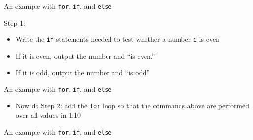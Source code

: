 \documentclass[ignorenonframetext,]{beamer}
\newenvironment{Shaded}{\begin{snugshade}}{\end{snugshade}}
\newcommand{\KeywordTok}[1]{\textcolor[rgb]{0.13,0.29,0.53}{\textbf{#1}}}
\newcommand{\DecValTok}[1]{\textcolor[rgb]{0.00,0.00,0.81}{#1}}
\newcommand{\StringTok}[1]{\textcolor[rgb]{0.31,0.60,0.02}{#1}}
\newcommand{\ControlFlowTok}[1]{\textcolor[rgb]{0.13,0.29,0.53}{\textbf{#1}}}
\newcommand{\OperatorTok}[1]{\textcolor[rgb]{0.81,0.36,0.00}{\textbf{#1}}}
\newcommand{\NormalTok}[1]{#1}
\providecommand{\tightlist}{%
	\setlength{\itemsep}{0pt}\setlength{\parskip}{0pt}}
\begin{document}
\begin{frame}[fragile]{An example with \texttt{for}, \texttt{if}, and
\texttt{else}}

Step 1:

\begin{itemize}
\tightlist
\item
  Write the \texttt{if} statements needed to test whether a number
  \texttt{i} is even
\item
  If it is even, output the number and ``is even.''
\item
  If it is odd, output the number and ``is odd''
\end{itemize}

\end{frame}

\begin{frame}[fragile]{An example with \texttt{for}, \texttt{if}, and
\texttt{else}}

\begin{Shaded}
\end{Shaded}

\begin{itemize}
\tightlist
\item
  Now do Step 2: add the \texttt{for} loop so that the commands above
  are performed over all values in 1:10
\end{itemize}

\end{frame}

\begin{frame}[fragile]{An example with \texttt{for}, \texttt{if}, and
\texttt{else}}

\begin{Shaded}
\end{Shaded}

\end{frame}
\end{document}
